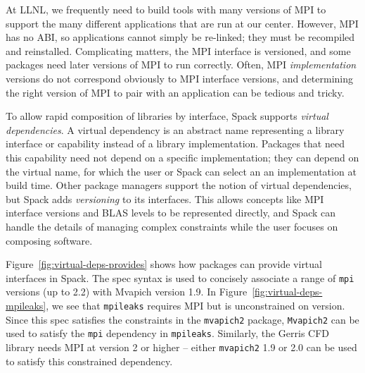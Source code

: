 At LLNL, we frequently need to build tools with many versions of MPI to support
the many different applications that are run at our center.
However, MPI has no ABI, so applications cannot simply be re-linked;
they must be recompiled and reinstalled. 
Complicating matters, the MPI interface is versioned, and some
packages need later versions of MPI to run correctly.  Often, MPI
{\it implementation} versions do not correspond obviously to MPI
interface versions, and determining the right version of 
MPI to pair with an application can be tedious and tricky.

To allow rapid composition of libraries by interface, Spack supports
{\it virtual dependencies}.  A virtual dependency is an abstract name
representing a library interface or capability instead of a library 
implementation.  Packages that need this capability need not depend on 
a specific implementation; they can depend on the virtual name, for which
the user or Spack can select an an implementation at build time.
Other package managers support the notion of virtual dependencies, but Spack
adds {\it versioning} to its interfaces.  This allows concepts like MPI
interface versions and BLAS levels to be represented directly, and Spack can
handle the details of managing complex constraints while the user focuses on 
composing software.

Figure~\ref{fig:virtual-deps-provides} shows how packages can provide
virtual interfaces in Spack.  The spec syntax is used to concisely
associate a range of {\tt mpi} versions (up to 2.2) with Mvapich version 1.9.
In Figure~\ref{fig:virtual-deps-mpileaks}, we see that {\tt mpileaks} requires
MPI but is unconstrained on version.  Since this spec satisfies the constraints in 
the {\tt mvapich2} package, {\tt Mvapich2} can be used to satisfy the {\tt mpi}
dependency in {\tt mpileaks}.  Similarly, the Gerris CFD library needs MPI
at version 2 or higher -- either {\tt mvapich2} 1.9 or 2.0 can be used to satisfy
this constrained dependency.






